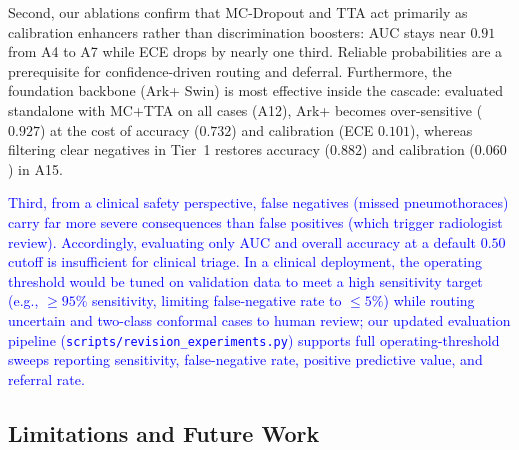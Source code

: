 \documentclass[diagnostics,article,submit,moreauthors]{Definitions/mdpi}
\newcommand{\rev}[1]{\textcolor{blue}{#1}}
\begin{document}
Second, our ablations confirm that MC-Dropout and TTA act primarily as calibration enhancers rather than discrimination boosters: AUC stays near $0.91$ from A4 to A7 while ECE drops by nearly one third. Reliable probabilities are a prerequisite for confidence-driven routing and deferral. Furthermore, the foundation backbone (Ark+ Swin) is most effective inside the cascade: evaluated standalone with MC+TTA on all cases (A12), Ark+ becomes over-sensitive ($0.927$) at the cost of accuracy ($0.732$) and calibration (ECE $0.101$), whereas filtering clear negatives in Tier~1 restores accuracy ($0.882$) and calibration ($0.060$) in A15.

\rev{Third, from a clinical safety perspective, false negatives (missed pneumothoraces) carry far more severe consequences than false positives (which trigger radiologist review). Accordingly, evaluating only AUC and overall accuracy at a default $0.50$ cutoff is insufficient for clinical triage. In a clinical deployment, the operating threshold would be tuned on validation data to meet a high sensitivity target (e.g., $\ge 95\%$ sensitivity, limiting false-negative rate to $\le 5\%$) while routing uncertain and two-class conformal cases to human review; our updated evaluation pipeline (\texttt{scripts/revision\_experiments.py}) supports full operating-threshold sweeps reporting sensitivity, false-negative rate, positive predictive value, and referral rate.}

\subsection{Limitations and Future Work}
\end{document}
